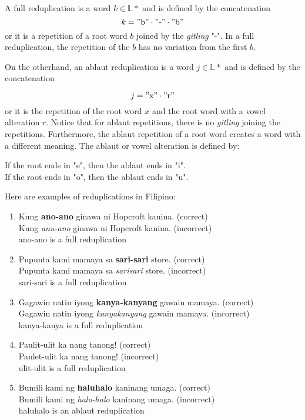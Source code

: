 A full reduplication is a word \(k \in \mathbb{L}*\) and is defined by the concatenation
\[
    k = "\text{b}" \cdot "\text{-}" \cdot "\text{b}"
\]
or it is a repetition of a root word \(b\) joined by the \textit{gitling} "-".
In a full reduplication, the repetition of the \(b\) has no variation from the first \(b\).

On the otherhand, an ablaut reduplication is a word \(j \in \mathbb{L}*\) and is defined by the
concatenation

\[
    j = "\text{x}" \cdot "\text{r}"
\]
or it is the repetition of the root word \(x\) and the root word with a vowel alteration \(r\). Notice
that for ablaut repetitions, there is no \textit{gitling} joining the repetitions. Furthermore,
the ablaut repetition of a root word creates a word with a different meaning. The ablaut or vowel
alteration is defined by:

\begin{center}
    If the root ends in "e", then the ablaut ends in "i". \\
    If the root ends in "o", then the ablaut ends in "u".
\end{center}

\begin{example}
    Here are examples of reduplications in Filipino:
\end{example}
\begin{enumerate}
    \item Kung \textbf{ano-ano} ginawa ni Hopcroft kanina. (correct) \\
          Kung \textit{anu-ano} ginawa ni Hopcroft kanina. (incorrect) \\
          ano-ano is a full reduplication
    \item Pupunta kami mamaya sa \textbf{sari-sari} store. (correct) \\
          Pupunta kami mamaya sa \textit{sarisari} store. (incorrect) \\
          sari-sari is a full reduplication
    \item Gagawin natin iyong \textbf{kanya-kanyang} gawain mamaya. (correct) \\
          Gagawin natin iyong \textit{kanyakanyang} gawain mamaya. (incorrect) \\
          kanya-kanya is a full reduplication
    \item Paulit-ulit ka nang tanong! (correct) \\
          Paulet-ulit ka nang tanong! (incorrect) \\
          ulit-ulit is a full reduplication
    \item Bumili kami ng \textbf{haluhalo} kaninang umaga. (correct) \\
          Bumili kami ng \textit{halo-halo} kaninang umaga. (incorrect) \\
          haluhalo is an ablaut reduplication
\end{enumerate}


